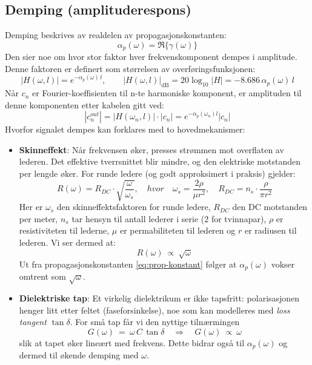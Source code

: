 \clearpage
\subsection{Demping (amplituderespons)}
Demping beskrives av realdelen av propagasjonskonstanten:
\[ 
  \alpha_p(\omega)=\Re\{\gamma(\omega)\}
\]
Den sier noe om hvor stor faktor hver frekvenskomponent dempes i amplitude. Denne faktoren er definert som størrelsen av overføringsfunksjonen:
\[
|H(\omega,l)|=e^{-\alpha_p(\omega)\,l}, \qquad |H(\omega,l)|_{\mathrm{dB}} = 20\log_{10}|H| = -8.686\,\alpha_p(\omega)\,l
\]
Når $c_n$ er Fourier-koeffisienten til n-te harmoniske komponent, er amplituden til denne komponenten etter kabelen gitt ved:
\[
|c_n^{out}| = |H(\omega_n,l)| \cdot |c _n| = e^{-\alpha_p(\omega_n) l} |c_n|
\]
Hvorfor signalet dempes kan forklares med to hovedmekanismer:\\
\begin{itemize}[leftmargin=2.8em,style=nextline]
  \item \textbf{Skinneffekt}: Når frekvensen øker, presses strømmen mot overflaten av lederen. Det effektive tverrsnittet blir mindre, og den elektriske motstanden per lengde øker. For runde ledere (og godt approksimert i praksis) gjelder:
    \begin{equation}
        R(\omega) = R_{DC} \cdot \sqrt{\frac{\omega}{\omega_{s}}}, \quad hvor \quad \omega_{s} = \frac{2 \rho}{ \mu r^2}, \quad R_{DC} = n_s \cdot \frac{\rho}{\pi r^2}
        \label{eq:skin-effekt}
    \end{equation}
    Her er $\omega_{s}$ den skinneffektsfaktoren for runde ledere, $R_{DC}$ den DC motstanden per meter, $n_s$ tar hensyn til antall lederer i serie (2 for tvinnapar), $\rho$ er resistiviteten til lederne, $\mu$ er permabiliteten til lederen og $r$ er radiusen til lederen. Vi ser dermed at:
    \[
    R(\omega)\ \propto\ \sqrt{\omega}
    \]
  Ut fra propagasjonskonstanten \eqref{eq:prop-konstant} følger at $\alpha_p(\omega)$ vokser omtrent som $\sqrt{\omega}$.\\
  \item \textbf{Dielektriske tap}: Et virkelig dielektrikum er ikke tapsfritt: polarisasjonen henger litt etter feltet (faseforsinkelse), noe som kan modelleres med \emph{loss tangent} \(\tan\delta\). For små tap får vi den nyttige tilnærmingen
  \begin{equation}
  G(\omega)\ =\ \omega\,C\,\tan\delta \quad \Rightarrow \quad G(\omega)\ \propto\ \omega
    \label{eq:dielectric_loss}
  \end{equation}
  slik at tapet øker lineært med frekvens. Dette bidrar også til \(\alpha_p(\omega)\) og dermed til økende demping med \(\omega\).\\
\end{itemize}
\clearpage

